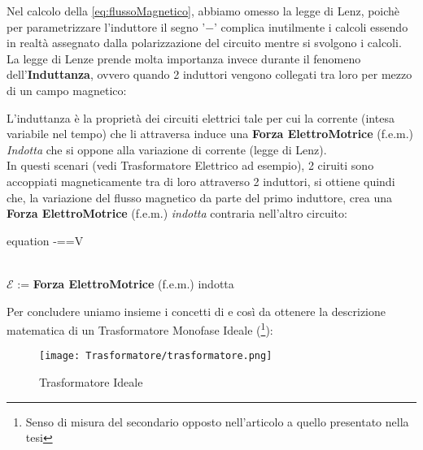 \noindent
Nel calcolo della \ref{eq:flussoMagnetico}, abbiamo omesso la legge di Lenz, poichè per parametrizzare l'induttore il segno '$ - $' complica inutilmente i calcoli essendo in realtà assegnato dalla polarizzazione del circuito mentre si svolgono i calcoli.\\
La legge di Lenze prende molta importanza invece durante il fenomeno dell'\textbf{Induttanza}, ovvero quando 2 induttori vengono collegati tra loro per mezzo di un campo magnetico:
\begin{de} 
	L'induttanza è la proprietà dei circuiti elettrici tale per cui la corrente (intesa variabile nel tempo) che li attraversa induce una \textbf{Forza ElettroMotrice} (f.e.m.) \textit{Indotta} che si oppone alla variazione di corrente (legge di Lenz).\\
	In questi scenari (vedi Trasformatore Elettrico ad esempio), 2 ciruiti sono accoppiati magneticamente tra di loro attraverso 2 induttori, si ottiene quindi che, la variazione del flusso magnetico da parte del primo induttore, crea una \textbf{Forza ElettroMotrice} (f.e.m.) \textit{indotta} contraria nell'altro circuito:
	\begin{vwcol}[widths={0.4,0.6}, sep=8mm, rule=0px]
		\vspace{-3mm}
		\begin{empheq}[box=\mathCalc]{equation}
			{\displaystyle -{}={}=V}
		\end{empheq}
		\newpage %
		\hfill\break \hfill\\[2mm]
		$ \mathcal{E} $ := \textbf{Forza ElettroMotrice} (f.e.m.) indotta
	\end{vwcol}
\end{de}
\noindent
Per concludere uniamo insieme i concetti di  e  così da ottenere la descrizione matematica di un Trasformatore Monofase Ideale (\cite{Transformatore}\footnote{Senso di misura del secondario opposto nell'articolo a quello presentato nella tesi}):
\begin{figure}[H]
	\centering
	\caption[Trasformatore ideale con Campo magnetico]{Trasformatore Ideale}
	\texttt{[image: Trasformatore/trasformatore.png]}
\end{figure}

